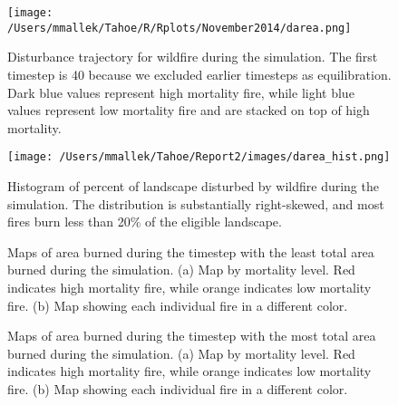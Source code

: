 \begin{figure}[!htbp]
\centering
\texttt{[image: /Users/mmallek/Tahoe/R/Rplots/November2014/darea.png]}
\caption{Disturbance trajectory for wildfire during the simulation. The first timestep is 40 because we excluded earlier timesteps as equilibration. Dark blue values represent high mortality fire, while light blue values represent low mortality fire and are stacked on top of high mortality.}
\label{fig:darea}
\end{figure}

\begin{figure}[!htbp]
\centering
\texttt{[image: /Users/mmallek/Tahoe/Report2/images/darea\_hist.png]}
\caption{Histogram of percent of landscape disturbed by wildfire during the simulation. The distribution is substantially right-skewed, and most fires burn less than 20\% of the eligible landscape.}
\label{fig:darea_hist}
\end{figure}


\begin{figure}[!htbp]
  \centering
  \caption{Maps of area burned during the timestep with the least total area burned during the simulation. (a) Map by mortality level. Red indicates high mortality fire, while orange indicates low mortality fire. (b) Map showing each individual fire in a different color.}
  \label{fig:darea_min_map}
\end{figure}

\begin{figure}[!htbp]
  \centering
  \caption{Maps of area burned during the timestep with the most total area burned during the simulation. (a) Map by mortality level. Red indicates high mortality fire, while orange indicates low mortality fire. (b) Map showing each individual fire in a different color.}
  \label{fig:darea_max_map}
\end{figure}

